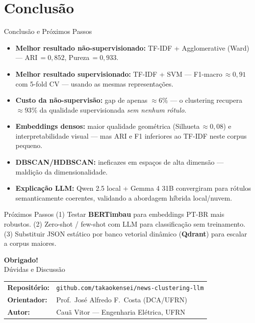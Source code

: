 \documentclass[aspectratio=169]{beamer}
\begin{document}
\section{Conclusão}
\begin{frame}{Conclusão e Próximos Passos}
  \begin{itemize}
    \item \textbf{Melhor resultado não-supervisionado:} TF-IDF + Agglomerative (Ward) —
          ARI\,$=0{,}852$, Pureza\,$=0{,}933$.
    \item \textbf{Melhor resultado supervisionado:} TF-IDF + SVM — F1-macro\,$\approx 0{,}91$
          com 5-fold CV — usando as mesmas representações.
    \item \textbf{Custo da não-supervisão:} gap de apenas $\approx 6\%$ — o clustering
          recupera $\approx 93\%$ da qualidade supervisionada \emph{sem nenhum rótulo}.
    \item \textbf{Embeddings densos:} maior qualidade geométrica (Silhueta\,$\approx 0{,}08$)
          e interpretabilidade visual — mas ARI e F1 inferiores ao TF-IDF neste corpus pequeno.
    \item \textbf{DBSCAN/HDBSCAN:} ineficazes em espaços de alta dimensão —
          maldição da dimensionalidade.
    \item \textbf{Explicação LLM:} Qwen 2.5 local + Gemma 4 31B convergiram para rótulos
          semanticamente coerentes, validando a abordagem híbrida local/nuvem.
  \end{itemize}
  \begin{block}{Próximos Passos}
    \small
    (1) Testar \textbf{BERTimbau} para embeddings PT-BR mais robustos.\quad
    (2) Zero-shot / few-shot com LLM para classificação sem treinamento.\quad
    (3) Substituir JSON estático por banco vetorial dinâmico (\textbf{Qdrant}) para
    escalar a corpus maiores.
  \end{block}
\end{frame}

\begin{frame}{}
  \vfill
  \centering
  {\Large \textbf{Obrigado!}}\\[1.0em]
  {\large Dúvidas e Discussão}\\[1.8em]
  \begin{tabular}{ll}
    \textbf{Repositório:} & \texttt{github.com/takaokensei/news-clustering-llm} \\
    \textbf{Orientador:}  & Prof.\ José Alfredo F.\ Costa (DCA/UFRN) \\
    \textbf{Autor:}       & Cauã Vitor — Engenharia Elétrica, UFRN \\
  \end{tabular}
  \vfill
\end{frame}
\end{document}
